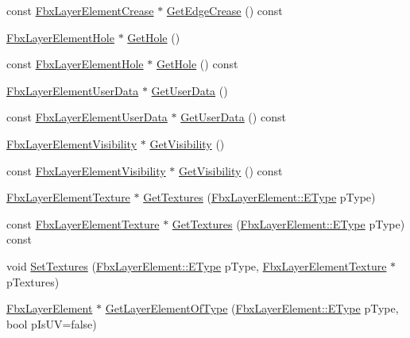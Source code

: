 \begin{DoxyCompactItemize}
\item 
const \hyperlink{class_fbx_layer_element_crease}{Fbx\+Layer\+Element\+Crease} $\ast$ \hyperlink{class_fbx_layer_a5211f03112abb24355d0c97c158a0336}{Get\+Edge\+Crease} () const
\item 
\hyperlink{class_fbx_layer_element_hole}{Fbx\+Layer\+Element\+Hole} $\ast$ \hyperlink{class_fbx_layer_aebe867dbfd267aeb3de587c0d87d1208}{Get\+Hole} ()
\item 
const \hyperlink{class_fbx_layer_element_hole}{Fbx\+Layer\+Element\+Hole} $\ast$ \hyperlink{class_fbx_layer_a8cd6dfd6c70d2f7d485f020b366f1c1c}{Get\+Hole} () const
\item 
\hyperlink{class_fbx_layer_element_user_data}{Fbx\+Layer\+Element\+User\+Data} $\ast$ \hyperlink{class_fbx_layer_ac5420149207fd66e6b0e1808ee9b9d79}{Get\+User\+Data} ()
\item 
const \hyperlink{class_fbx_layer_element_user_data}{Fbx\+Layer\+Element\+User\+Data} $\ast$ \hyperlink{class_fbx_layer_ae91e17fb19ef5c6051a714e4bf8249fd}{Get\+User\+Data} () const
\item 
\hyperlink{class_fbx_layer_element_visibility}{Fbx\+Layer\+Element\+Visibility} $\ast$ \hyperlink{class_fbx_layer_a3e2723477c9dab8c3c9abddcb4e1abf5}{Get\+Visibility} ()
\item 
const \hyperlink{class_fbx_layer_element_visibility}{Fbx\+Layer\+Element\+Visibility} $\ast$ \hyperlink{class_fbx_layer_ad87b993616dc534df4b90e0606918302}{Get\+Visibility} () const
\item 
\hyperlink{class_fbx_layer_element_texture}{Fbx\+Layer\+Element\+Texture} $\ast$ \hyperlink{class_fbx_layer_a6c407cd486b08abafb7d966e9bb8dcf6}{Get\+Textures} (\hyperlink{class_fbx_layer_element_a8c95c5cd880b56c776acd379bd86f42c}{Fbx\+Layer\+Element\+::\+E\+Type} p\+Type)
\item 
const \hyperlink{class_fbx_layer_element_texture}{Fbx\+Layer\+Element\+Texture} $\ast$ \hyperlink{class_fbx_layer_a2e5276f58eacbf3c03ea334581db1fc5}{Get\+Textures} (\hyperlink{class_fbx_layer_element_a8c95c5cd880b56c776acd379bd86f42c}{Fbx\+Layer\+Element\+::\+E\+Type} p\+Type) const
\item 
void \hyperlink{class_fbx_layer_ad18cd7d4f5591c16f4a0f230b91a19e3}{Set\+Textures} (\hyperlink{class_fbx_layer_element_a8c95c5cd880b56c776acd379bd86f42c}{Fbx\+Layer\+Element\+::\+E\+Type} p\+Type, \hyperlink{class_fbx_layer_element_texture}{Fbx\+Layer\+Element\+Texture} $\ast$p\+Textures)
\item 
\hyperlink{class_fbx_layer_element}{Fbx\+Layer\+Element} $\ast$ \hyperlink{class_fbx_layer_a417bb2646afafaac9cc3e79caa742db3}{Get\+Layer\+Element\+Of\+Type} (\hyperlink{class_fbx_layer_element_a8c95c5cd880b56c776acd379bd86f42c}{Fbx\+Layer\+Element\+::\+E\+Type} p\+Type, bool p\+Is\+UV=false)

\end{DoxyCompactItemize}
